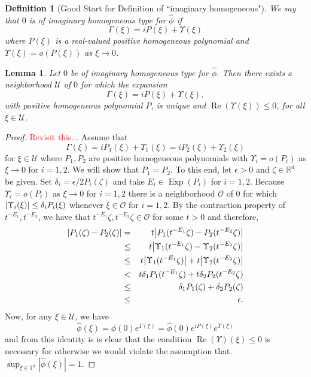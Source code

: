 \documentclass[11pt]{article}
\newtheorem{lemma}[theorem]{Lemma}
\newtheorem{definition}[theorem]{Definition}
\renewcommand\Re{\operatorname{Re}}%
\newcommand\Exp{\operatorname{Exp}}
\newcommand\R{\mathbb{R}}
\begin{document}
\begin{definition}[Good Start for Definition of ``imaginary homogeneous"]
We say that $0$ is of \textit{imaginary homogeneous type} for $\hat{\phi}$ if
\begin{equation*}
    \Gamma(\xi)=iP(\xi)+\Upsilon(\xi)
\end{equation*}
where $P(\xi)$ is a real-valued positive homogeneous polynomial and $\Upsilon(\xi) = o(P(\xi))$ as $\xi\to 0$.
\end{definition}
\begin{lemma}\label{lem:UniqueP}
Let $0$ be of imaginary homogeneous type for $\hat{\phi}$. Then there exists a neighborhood $\mathcal{U}$ of $0$ for which the expansion 
\begin{equation*}
    \Gamma(\xi)=iP(\xi)+\Upsilon(\xi),
\end{equation*}
with positive homogeneous polynomial $P$, is unique and $\Re(\Upsilon(\xi))\leq 0$, for all $\xi\in \mathcal{U}$.
\end{lemma}
\begin{proof}
\textcolor{red}{Revisit this...} Assume that
\begin{equation*}
    \Gamma(\xi) = iP_1(\xi) + \Upsilon_1(\xi) = iP_2(\xi) + \Upsilon_2(\xi)
\end{equation*}
for $\xi \in \mathcal{U}$ where $P_1,P_2$ are positive homogeneous polynomials with $\Upsilon_i = o(P_i)$ as $\xi \to 0$ for $i = 1,2$. We will show that $P_1 = P_2$.  To this end, let $\epsilon > 0$ and $\zeta \in \R^d$ be given. Set $\delta_i = \epsilon/2P_i(\zeta)$ and take $E_i\in \Exp(P_i)$ for $i=1,2$. Because $\Upsilon_i = o(P_i)$ as $\xi \to 0$ for $i=1,2$ there is a neighborhood $\mathcal{O}$ of 0 for which $\abs{\Upsilon_i(\xi)} \leq \delta_i P_i(\xi)$  whenever $\xi \in \mathcal{O}$ for $i=1,2$. By the contraction property of $t^{-E_1},t^{-E_2}$, we have that $t^{-E_1}\zeta,t^{-E_2}\zeta \in \mathcal{O}$ for some $t > 0$ and therefore,
\begin{eqnarray*}
    \abs{P_1(\zeta) - P_2(\zeta)} &=& t\abs{P_1(t^{-E_1}\zeta) - P_2(t^{-E_2} \zeta)} \\ 
    &\leq& t\abs{\Upsilon_1(t^{-E_1}\zeta) - \Upsilon_2(t^{-E_2} \zeta)}\\
    &\leq& t\abs{\Upsilon_1(t^{-E_1}\zeta)} + t\abs{\Upsilon_2(t^{-E_2}\zeta)}  \\ 
    &<& t\delta_1P_1(t^{-E_1}\zeta) + t\delta_2P_2(t^{-E_2}\zeta) \\
    &\leq& \delta_1 P_1(\zeta) + \delta_2 P_2(\zeta) \\
    &\leq& \epsilon.
\end{eqnarray*}
Now, for any $\xi\in \mathcal{U}$, we have
\begin{equation*}
    \hat{\phi}(\xi)=\hat{\phi}(0)e^{\Gamma(\xi)}=\hat{\phi}(0)e^{iP(\xi)}e^{\Upsilon(\xi)}
\end{equation*}
and from this identity is is clear that the condition $\Re(\Upsilon)(\xi)\leq 0$ is necessary for otherwise we would violate the assumption that.  $\sup_{\xi\in\mathbb{T}^d}|\hat\phi(\xi)|=1.$
\end{proof}
\end{document}

